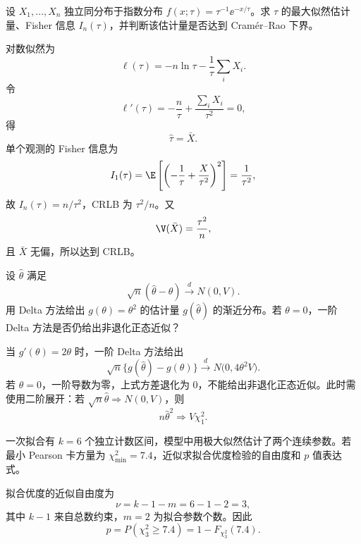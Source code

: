 \begin{question}
设 $X_1,\ldots,X_n$ 独立同分布于指数分布 $f(x;\tau)=\tau^{-1}\ee^{-x/\tau}$。求 $\tau$ 的最大似然估计量、Fisher 信息 $I_n(\tau)$，并判断该估计量是否达到 Cram\'er--Rao 下界。
\begin{solution}
对数似然为
\[
\ell(\tau)=-n\ln\tau-\frac1\tau\sum_iX_i.
\]
令
\[
\ell'(\tau)=-\frac n\tau+\frac{\sum_iX_i}{\tau^2}=0,
\]
得
\[
\hat\tau=\bar X.
\]
单个观测的 Fisher 信息为
\[
I_1(\tau)=\E\left[\left(-\frac1\tau+\frac X{\tau^2}\right)^2\right]=\frac1{\tau^2},
\]
故 $I_n(\tau)=n/\tau^2$，CRLB 为 $\tau^2/n$。又
\[
\V(\bar X)=\frac{\tau^2}{n},
\]
且 $\bar X$ 无偏，所以达到 CRLB。
\end{solution}
\end{question}

\begin{question}
设 $\hat\theta$ 满足
\[
\sqrt n(\hat\theta-\theta)\xrightarrow{d}N(0,V).
\]
用 Delta 方法给出 $g(\theta)=\theta^2$ 的估计量 $g(\hat\theta)$ 的渐近分布。若 $\theta=0$，一阶 Delta 方法是否仍给出非退化正态近似？
\begin{solution}
当 $g'(\theta)=2\theta$ 时，一阶 Delta 方法给出
\[
\sqrt n\{g(\hat\theta)-g(\theta)\}
\xrightarrow{d}N\bigl(0,4\theta^2V\bigr).
\]
若 $\theta=0$，一阶导数为零，上式方差退化为 $0$，不能给出非退化正态近似。此时需使用二阶展开：若 $\sqrt n\hat\theta\Rightarrow N(0,V)$，则
\[
n\hat\theta^2\Rightarrow V\chi_1^2.
\]
\end{solution}
\end{question}

\begin{question}
一次拟合有 $k=6$ 个独立计数区间，模型中用极大似然估计了两个连续参数。若最小 Pearson 卡方量为 $\chi^2_{\min}=7.4$，近似求拟合优度检验的自由度和 $p$ 值表达式。
\begin{solution}
拟合优度的近似自由度为
\[
\nu=k-1-m=6-1-2=3,
\]
其中 $k-1$ 来自总数约束，$m=2$ 为拟合参数个数。因此
\[
p=P(\chi^2_3\ge 7.4)=1-F_{\chi^2_3}(7.4).
\]
\end{solution}
\end{question}

